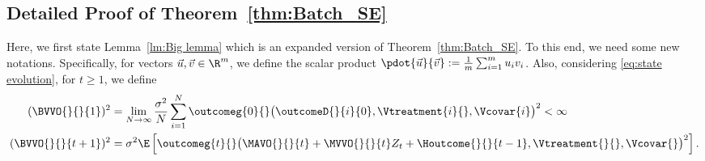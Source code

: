 \subsection{Detailed Proof of Theorem~\ref{thm:Batch_SE}}
\label{apndx:big_lemma}
% 
Here, we first state Lemma~\ref{lm:Big lemma} which is an expanded version of Theorem~\ref{thm:Batch_SE}. To this end, we need some new notations. Specifically, for vectors $\Vec{u},\Vec{v} \in \R^m$, we define the scalar product $\pdot{\Vec{u}}{\Vec{v}}:= \frac{1}{m} \sum_{i=1}^m u_i v_i$. Also, considering \eqref{eq:state evolution}, for $t\geq 1$, we define
% 
\begin{equation}
    \label{eq:state evolution_fixed part}
    \begin{aligned}
        (\BVVO{}{}{1})^2
            &=
            \lim_{N\rightarrow \infty}
            \frac{\sigma^2}{N} \sum_{i=1}^N
            \outcomeg{0}{}\big(
            \outcomeD{}{i}{0},\Vtreatment{i}{},\Vcovar{i}
            \big)^2 < \infty
        \\
        (\BVVO{}{}{t+1})^2 &=
        \sigma^2 \E\left[
        \outcomeg{t}{} \big(\MAVO{}{}{t} + \MVVO{}{}{t} Z_t + \Houtcome{}{}{t-1}, \Vtreatment{}{},\Vcovar{}\big)^2
        \right].
    \end{aligned}
\end{equation}
% 


